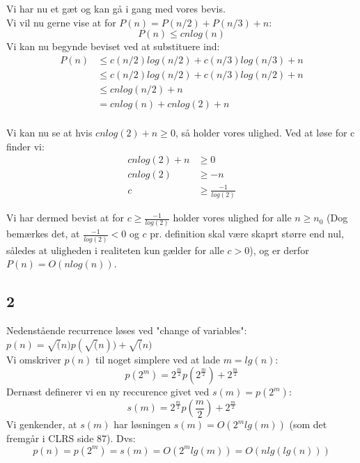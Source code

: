 Vi har nu et gæt og kan gå i gang med vores bevis.\\
Vi vil nu gerne vise at for $P(n) = P(n/2) + P(n/3) + n$:
\begin{equation*}
	P(n) \leq cnlog(n)
\end{equation*}
Vi kan nu begynde beviset ved at substituere ind:
\begin{align*}
	P(n) &\leq c(n/2)log(n/2) + c(n/3)log(n/3) + n\\
	&\leq c(n/2)log(n/2) + c(n/3)log(n/2) + n\\
	&\leq cnlog(n/2) + n\\
	&= cnlog(n) + cnlog(2) + n\\
\end{align*}

Vi kan nu se at hvis $cnlog(2) + n \geq 0$, så holder vores ulighed. Ved at løse for c finder vi:
\begin{align*}
	cnlog(2) + n &\geq 0\\
	cnlog(2) &\geq -n\\
	c &\geq \frac{-1}{log(2)}
\end{align*}

Vi har dermed bevist at for $c \geq \frac{-1}{log(2)}$ holder vores ulighed for alle $n \geq n_0$ (Dog bemærkes det, at $\frac{-1}{log(2)} < 0$ og $c$ pr. definition skal være skaprt større end nul, således at uligheden i realiteten kun gælder for alle $c > 0$), og er derfor $P(n) = O(nlog(n))$.

\subsection{2}

Nedenstående recurrence løses ved "change of variables":\\
$p(n) = \sqrt(n)p(\sqrt(n)) + \sqrt(n)$\\
Vi omskriver $p(n)$ til noget simplere ved at lade $m = lg(n)$:
$$p(2^m) = 2^{\frac{m}{2}}p(2^{\frac{m}{2}}) + 2^{\frac{m}{2}}$$
Dernæst definerer vi en ny reccurence givet ved $s(m) = p(2^m)$:
$$s(m) = 2^{\frac{m}{2}}p(\frac{m}{2}) + 2^{\frac{m}{2}}$$
Vi genkender, at $s(m)$ har løsningen $s(m) = O(2^mlg(m))$ (som det fremgår i CLRS side 87).
Dvs:
$$p(n) = p(2^m) = s(m) = O(2^mlg(m)) = O(nlg(lg(n)))$$
